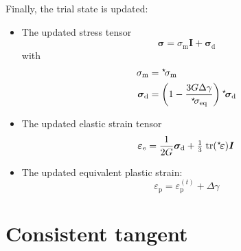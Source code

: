 \documentclass[namecite, fleqn]{goose-article}
\newcommand\leftstar[1]{\hspace*{-.3em}~^\star\!#1}
\begin{document}
Finally, the trial state is updated:
\begin{itemize}

    \item The updated stress tensor
    \begin{equation}
        \bm{\sigma}
        = \sigma_\mathrm{m} \bm{I}
        + \bm{\sigma}_\mathrm{d}
    \end{equation}
    with
    \begin{align}
        \sigma_\mathrm{m}
        &= \leftstar{\sigma}_\mathrm{m}
        \\
        \bm{\sigma}_\mathrm{d}
        &= \left(
            1 - \frac{3 G \Delta \gamma}{\leftstar{\sigma}_\mathrm{eq}}
        \right) \leftstar{\bm{\sigma}}_\mathrm{d}
    \end{align}

    \item The updated elastic strain tensor
    \begin{equation}
        \bm{\varepsilon}_\mathrm{e}
        = \frac{1}{2G} \bm{\sigma}_\mathrm{d}
        + \tfrac{1}{3} \;\mathrm{tr} (\leftstar{\bm{\varepsilon}}) \bm{I}
    \end{equation}

    \item The updated equivalent plastic strain:
    \begin{equation}
        \varepsilon_\mathrm{p}
        = \varepsilon_\mathrm{p}^{(t)}
        + \Delta \gamma
    \end{equation}

\end{itemize}

\section{Consistent tangent}
\end{document}
